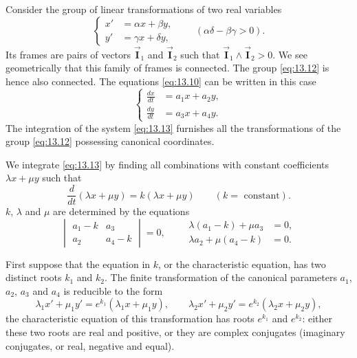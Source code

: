 \documentclass[leqno,11pt]{book}
\numberwithin{equation}{chapter}
\theoremstyle{shape1}
\theoremstyle{shapesmall}
\newcommand{\rvec}[1]{\vec{\mathbf{#1}}}
\newcommand{\ivec}{\rvec{I}}
\begin{document}
Consider the group of linear transformations of two real variables
\begin{equation}
  \label{eq:13.12}
  \left\{
    \begin{aligned}
      x'&=\alpha x+\beta y,\\
      y'&=\gamma x+\delta y,
    \end{aligned}
  \right.
  \qquad(\alpha\delta-\beta\gamma>0).
\end{equation}
Its frames are pairs of vectors $\ivec_{1}$ and $\ivec_{2}$ such that $\ivec_{1}\wedge\ivec_{2}>0$. We see geometrically that this family of frames is connected. The group \eqref{eq:13.12} is hence also connected. The equations \eqref{eq:13.10} can be written in this case
\begin{equation}
  \label{eq:13.13}
  \left\{
    \begin{aligned}
      \frac{dx}{dt}&=a_{1}x+a_{2}y,\\
      \frac{dy}{dt}&=a_{3}x+a_{4}y.
    \end{aligned}
  \right.
\end{equation}
The integration of the system \eqref{eq:13.13} furnishes all the transformations of the group \eqref{eq:13.12} possessing canonical coordinates.

We integrate \eqref{eq:13.13} by finding all combinations with constant coefficients $\lambda x+\mu y$ such that
\[
\frac{d}{dt}(\lambda x+\mu y)=k(\lambda x+\mu y)\qquad(k=\text{ constant}).
\]
$k$, $\lambda$ and $\mu$ are determined by the equations
\begin{equation}
  \label{eq:13.14}
  \begin{vmatrix}
    a_{1}-k&a_{3}\\
    a_{2}&a_{4}-k
  \end{vmatrix}
  =0,\qquad
  \begin{aligned}
    \lambda(a_{1}-k)+\mu a_{3}&=0,\\
    \lambda a_{2}+\mu(a_{4}-k)&=0.
  \end{aligned}
\end{equation}

First suppose that the equation in $k$, or the characteristic equation, has two distinct roots $k_{1}$ and $k_{2}$. The finite transformation of the canonical parameters $a_{1}$, $a_{2}$, $a_{3}$ and $a_{4}$ is reducible to the form
\begin{equation}
  \label{eq:13.15}
  \lambda_{1}x'+\mu_{1}y'=e^{k_{1}}(\lambda_{1}x+\mu_{1}y),\qquad\lambda_{2}x'+\mu_{2}y'=e^{k_{2}}(\lambda_{2}x+\mu_{2}y),
\end{equation}
the characteristic equation of this transformation has roots $e^{k_{1}}$ and $e^{k_{2}}$: either these two roots are real and positive, or they are complex conjugates (imaginary conjugates, or real, negative and equal).
\end{document}
